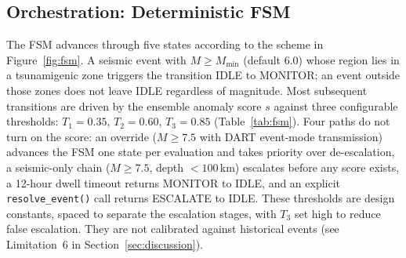 \documentclass{article}
\begin{document}
\subsection{Orchestration: Deterministic FSM}
\label{sec:fsm}

The FSM advances through five states according to the scheme in
Figure~\ref{fig:fsm}. A seismic event with $M \geq M_\text{min}$
(default 6.0) whose region lies in a tsunamigenic zone triggers the
transition IDLE to MONITOR; an event outside those zones does not
leave IDLE regardless of magnitude. Most subsequent transitions are
driven by the ensemble anomaly score $s$ against three configurable
thresholds: $T_1 = 0.35$, $T_2 = 0.60$, $T_3 = 0.85$
(Table~\ref{tab:fsm}).  Four paths do not turn on the score: an
override ($M \geq 7.5$ with DART event-mode transmission) advances the
FSM one state per evaluation and takes priority over de-escalation, a
seismic-only chain ($M \geq 7.5$, depth $< 100$\,km) escalates before
any score exists, a 12-hour dwell timeout returns MONITOR to IDLE, and
an explicit \texttt{resolve\_event()} call returns ESCALATE to IDLE.
These thresholds are design constants, spaced to separate the
escalation stages, with $T_3$ set high to reduce false escalation.
They are not calibrated against historical events (see Limitation~6 in
Section~\ref{sec:discussion}).
\end{document}

